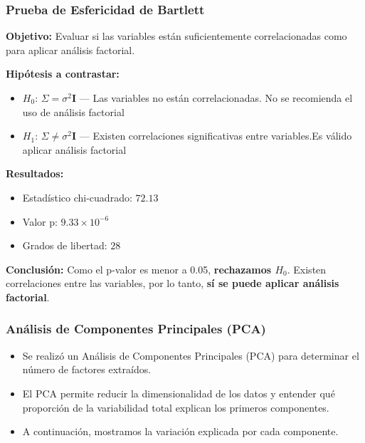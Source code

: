 \documentclass[
	11pt, %
]{beamer}
\begin{document}

\begin{frame}
\frametitle{Prueba de Esfericidad de Bartlett}

\textbf{Objetivo:} Evaluar si las variables están suficientemente correlacionadas como para aplicar análisis factorial.

\vspace{0.3cm}
\textbf{Hipótesis a contrastar:}
\begin{itemize}
    \item $H_0$: $\Sigma = \sigma^2 \mathbf{I}$ — Las variables no están correlacionadas. No se recomienda el uso de análisis factorial
    
    \item $H_1$: $\Sigma \neq \sigma^2 \mathbf{I}$ — Existen correlaciones significativas entre variables.Es válido aplicar análisis factorial
\end{itemize}

\vspace{0.3cm}
\textbf{Resultados:}
\begin{itemize}
    \item Estadístico chi-cuadrado: $72.13$
    \item Valor p: $9.33 \times 10^{-6}$
    \item Grados de libertad: $28$
\end{itemize}

\vspace{0.3cm}
\textbf{Conclusión:} Como el p-valor es menor a 0.05, \textbf{rechazamos $H_0$}. Existen correlaciones entre las variables, por lo tanto, \textbf{sí se puede aplicar análisis factorial}.
\end{frame}



\begin{frame}
\frametitle{Análisis de Componentes Principales (PCA)}

\begin{itemize}
    \item Se realizó un Análisis de Componentes Principales (PCA) para determinar el número de factores extraídos.
    \item El PCA permite reducir la dimensionalidad de los datos y entender qué proporción de la variabilidad total explican los primeros componentes.
    \item A continuación, mostramos la variación explicada por cada componente.
\end{itemize}

\end{frame}
\end{document}

